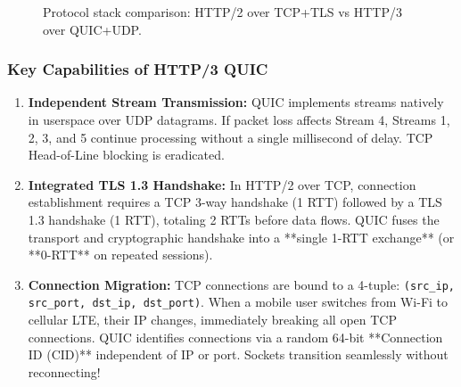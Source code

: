\begin{figure}[htbp]
\centering
{}
\caption{Protocol stack comparison: HTTP/2 over TCP+TLS vs HTTP/3 over QUIC+UDP.}
\label{fig:http3-stack}
\end{figure}

\subsubsection{Key Capabilities of HTTP/3 QUIC}
\begin{enumerate}[leftmargin=15pt]
  \item \textbf{Independent Stream Transmission:} QUIC implements streams natively in userspace over UDP datagrams. If packet loss affects Stream 4, Streams 1, 2, 3, and 5 continue processing without a single millisecond of delay. TCP Head-of-Line blocking is eradicated.
  \item \textbf{Integrated TLS 1.3 Handshake:} In HTTP/2 over TCP, connection establishment requires a TCP 3-way handshake (1 RTT) followed by a TLS 1.3 handshake (1 RTT), totaling 2 RTTs before data flows. QUIC fuses the transport and cryptographic handshake into a **single 1-RTT exchange** (or **0-RTT** on repeated sessions).
  \item \textbf{Connection Migration:} TCP connections are bound to a 4-tuple: \texttt{(src\_ip, src\_port, dst\_ip, dst\_port)}. When a mobile user switches from Wi-Fi to cellular LTE, their IP changes, immediately breaking all open TCP connections. QUIC identifies connections via a random 64-bit **Connection ID (CID)** independent of IP or port. Sockets transition seamlessly without reconnecting!
\end{enumerate}

